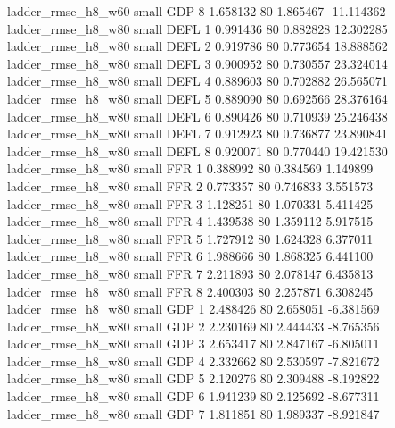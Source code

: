      ladder_rmse_h8_w60      small      GDP                 8 1.658132 80       1.865467         -11.114362
      ladder_rmse_h8_w80      small     DEFL                 1 0.991436 80       0.882828          12.302285
      ladder_rmse_h8_w80      small     DEFL                 2 0.919786 80       0.773654          18.888562
      ladder_rmse_h8_w80      small     DEFL                 3 0.900952 80       0.730557          23.324014
      ladder_rmse_h8_w80      small     DEFL                 4 0.889603 80       0.702882          26.565071
      ladder_rmse_h8_w80      small     DEFL                 5 0.889090 80       0.692566          28.376164
      ladder_rmse_h8_w80      small     DEFL                 6 0.890426 80       0.710939          25.246438
      ladder_rmse_h8_w80      small     DEFL                 7 0.912923 80       0.736877          23.890841
      ladder_rmse_h8_w80      small     DEFL                 8 0.920071 80       0.770440          19.421530
      ladder_rmse_h8_w80      small      FFR                 1 0.388992 80       0.384569           1.149899
      ladder_rmse_h8_w80      small      FFR                 2 0.773357 80       0.746833           3.551573
      ladder_rmse_h8_w80      small      FFR                 3 1.128251 80       1.070331           5.411425
      ladder_rmse_h8_w80      small      FFR                 4 1.439538 80       1.359112           5.917515
      ladder_rmse_h8_w80      small      FFR                 5 1.727912 80       1.624328           6.377011
      ladder_rmse_h8_w80      small      FFR                 6 1.988666 80       1.868325           6.441100
      ladder_rmse_h8_w80      small      FFR                 7 2.211893 80       2.078147           6.435813
      ladder_rmse_h8_w80      small      FFR                 8 2.400303 80       2.257871           6.308245
      ladder_rmse_h8_w80      small      GDP                 1 2.488426 80       2.658051          -6.381569
      ladder_rmse_h8_w80      small      GDP                 2 2.230169 80       2.444433          -8.765356
      ladder_rmse_h8_w80      small      GDP                 3 2.653417 80       2.847167          -6.805011
      ladder_rmse_h8_w80      small      GDP                 4 2.332662 80       2.530597          -7.821672
      ladder_rmse_h8_w80      small      GDP                 5 2.120276 80       2.309488          -8.192822
      ladder_rmse_h8_w80      small      GDP                 6 1.941239 80       2.125692          -8.677311
      ladder_rmse_h8_w80      small      GDP                 7 1.811851 80       1.989337          -8.921847
